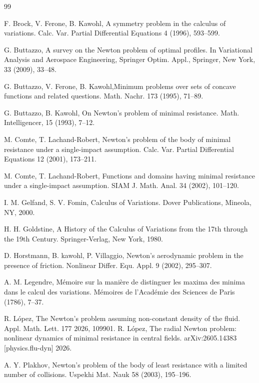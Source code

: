 \documentclass[a4paper,12pt]{amsart}
\theoremstyle{definition}
\begin{document}
\begin{thebibliography}{99}

  F. Brock, V. Ferone, B. Kawohl,  A symmetry problem in the calculus of variations. Calc. Var. Partial Differential Equations 4 (1996), 593--599.
 
 G. Buttazzo, A survey on the Newton problem of optimal profiles. In Variational Analysis and Aerospace Engineering, Springer Optim. Appl., Springer, New York, 33 (2009), 33--48. 

 G. Buttazzo, V. Ferone, B. Kawohl,Minimum problems over sets of concave functions and related questions. Math. Nachr. 173 (1995), 71--89.

G. Buttazzo, B. Kawohl, On Newton's problem of minimal resistance. Math. Intelligencer, 15 (1993), 7--12.
 
  M. Comte, T. Lachand-Robert,   Newton’s problem of the body of minimal resistance under a
single-impact assumption. Calc. Var. Partial Differential Equations 12   (2001), 173--211.

 M. Comte, T. Lachand-Robert,  Functions and domains having minimal resistance under a
single-impact assumption. SIAM J. Math. Anal. 34   (2002), 101--120.
 

  I. M. Gelfand, S. V. Fomin, Calculus of Variations. Dover Publications, Mineola, NY, 2000.
 
  H. H. Goldstine, A History of the Calculus of Variations from the 17th through the 19th Century. Springer-Verlag, New York, 1980.
 
  D. Horstmann, B. kawohl, P. Villaggio,  Newton’s aerodynamic problem in the presence of friction. Nonlinear Differ. Equ. Appl. 9 (2002), 295--307.
 
  A. M. Legendre, M\'emoire sur la mani\`ere de distinguer les maxima des minima dans le calcul des variations. M\'emoires de l’Acad\'emie des Sciences de Paris (1786), 7--37.
 
  R. L\'opez, The Newton's problem assuming non-constant density of the fluid. Appl. Math. Lett.  177   2026, 109901.
  R. L\'opez, The radial Newton problem: nonlinear dynamics of minimal resistance in central fields. arXiv:2605.14383 [physics.flu-dyn] 2026.
 
  A. Y. Plakhov,   Newton’s problem of the body of least resistance with a limited number of collisions. Uspekhi Mat. Nauk 58   (2003), 195--196.


\end{thebibliography}
\end{document}
